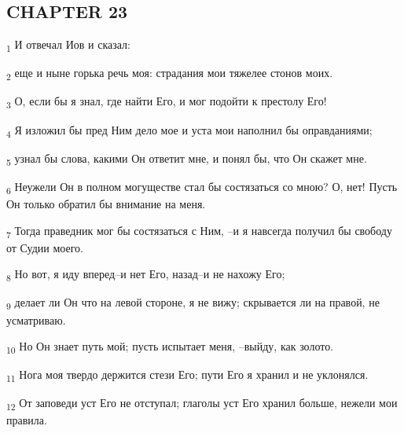 \subsection{CHAPTER 23}
\begin{tcolorbox}
\textsubscript{1} И отвечал Иов и сказал:
\end{tcolorbox}
\begin{tcolorbox}
\textsubscript{2} еще и ныне горька речь моя: страдания мои тяжелее стонов моих.
\end{tcolorbox}
\begin{tcolorbox}
\textsubscript{3} О, если бы я знал, где найти Его, и мог подойти к престолу Его!
\end{tcolorbox}
\begin{tcolorbox}
\textsubscript{4} Я изложил бы пред Ним дело мое и уста мои наполнил бы оправданиями;
\end{tcolorbox}
\begin{tcolorbox}
\textsubscript{5} узнал бы слова, какими Он ответит мне, и понял бы, что Он скажет мне.
\end{tcolorbox}
\begin{tcolorbox}
\textsubscript{6} Неужели Он в полном могуществе стал бы состязаться со мною? О, нет! Пусть Он только обратил бы внимание на меня.
\end{tcolorbox}
\begin{tcolorbox}
\textsubscript{7} Тогда праведник мог бы состязаться с Ним, --и я навсегда получил бы свободу от Судии моего.
\end{tcolorbox}
\begin{tcolorbox}
\textsubscript{8} Но вот, я иду вперед--и нет Его, назад--и не нахожу Его;
\end{tcolorbox}
\begin{tcolorbox}
\textsubscript{9} делает ли Он что на левой стороне, я не вижу; скрывается ли на правой, не усматриваю.
\end{tcolorbox}
\begin{tcolorbox}
\textsubscript{10} Но Он знает путь мой; пусть испытает меня, --выйду, как золото.
\end{tcolorbox}
\begin{tcolorbox}
\textsubscript{11} Нога моя твердо держится стези Его; пути Его я хранил и не уклонялся.
\end{tcolorbox}
\begin{tcolorbox}
\textsubscript{12} От заповеди уст Его не отступал; глаголы уст Его хранил больше, нежели мои правила.
\end{tcolorbox}
